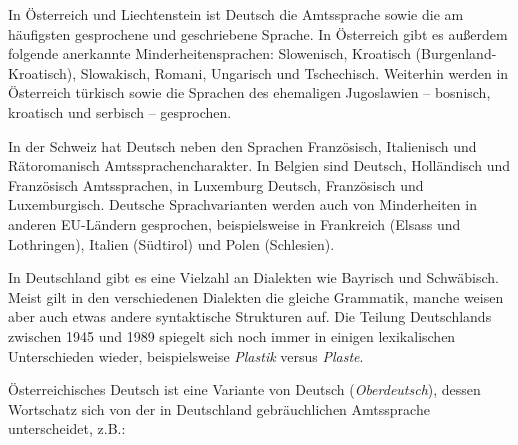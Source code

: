 \documentclass[]{../../metanetpaper}
\begin{document}
\begin{Parallel}[c]{80mm}{80mm}
{In Österreich und Liechtenstein ist Deutsch die Amtssprache sowie die am häufigsten gesprochene und geschriebene Sprache. In Österreich gibt es außerdem folgende anerkannte Minderheitensprachen: Slowenisch, Kroatisch (Burgenland-Kroatisch), Slowakisch, Romani, Ungarisch und Tschechisch. Weiterhin werden in Österreich türkisch sowie die Sprachen des ehemaligen Jugoslawien – bosnisch, kroatisch und serbisch – gesprochen.

In der Schweiz hat Deutsch neben den Sprachen Französisch, Italienisch und Rätoromanisch Amtssprachencharakter. In Belgien sind Deutsch, Holländisch und Französisch Amtssprachen, in Luxemburg Deutsch, Französisch und Luxemburgisch. Deutsche Sprachvarianten werden auch von Minderheiten in anderen EU-Ländern gesprochen, beispielsweise in Frankreich (Elsass und Lothringen), Italien (Südtirol) und Polen (Schlesien).

In Deutschland gibt es eine Vielzahl an Dialekten wie Bayrisch und Schwäbisch. Meist gilt in den verschiedenen Dialekten die gleiche Grammatik, manche weisen aber auch etwas andere syntaktische Strukturen auf. Die Teilung Deutschlands zwischen 1945 und 1989 spiegelt sich noch immer in einigen lexikalischen Unterschieden wieder, beispielsweise \textit{Plastik} versus \textit{Plaste}.

Österreichisches Deutsch ist eine Variante von Deutsch (\textit{Oberdeutsch}), dessen Wortschatz sich von der in Deutschland gebräuchlichen Amtssprache unterscheidet, z.B.:
  }

\end{Parallel}
\end{document}
